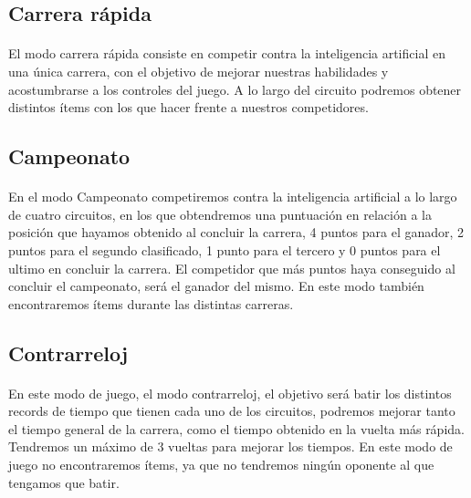 \subsection{Carrera rápida}

\paragraph{}
El modo carrera rápida consiste en competir contra la inteligencia artificial en una única carrera, con el objetivo de 
mejorar nuestras habilidades y acostumbrarse a los controles del juego. A lo largo del circuito podremos obtener distintos
ítems con los que hacer frente a nuestros competidores.

\subsection{Campeonato}

\paragraph{}
En el modo Campeonato competiremos contra la inteligencia artificial a lo largo de cuatro circuitos, en los que obtendremos
una puntuación en relación a la posición que hayamos obtenido al concluir la carrera, 4 puntos para el ganador, 2 puntos para
el segundo clasificado, 1 punto para el tercero y 0 puntos para el ultimo en concluir la carrera. El competidor que más puntos haya 
conseguido al concluir el campeonato, será el ganador del mismo. En este modo
también encontraremos ítems durante las distintas carreras.

\subsection{Contrarreloj}

\paragraph{}
En este modo de juego, el modo contrarreloj, el objetivo será batir los distintos records de tiempo que tienen cada uno de los 
circuitos, podremos mejorar tanto el tiempo general de la carrera, como el tiempo obtenido en la vuelta más rápida. Tendremos
un máximo de 3 vueltas para mejorar los tiempos. En este modo de juego no
encontraremos ítems, ya que no tendremos ningún oponente
al que tengamos que batir.


